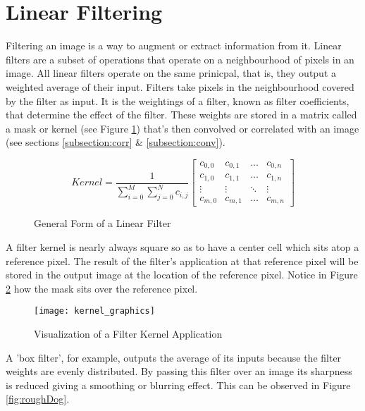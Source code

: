 \section{Linear Filtering}

Filtering an image is a way to augment or extract information from it. Linear filters are a subset of operations that operate on a neighbourhood of pixels in an image. All linear filters operate on the same prinicpal, that is, they output a weighted average of their input. Filters take pixels in the neighbourhood covered by the filter as input. It is the weightings of a filter, known as filter coefficients, that determine the effect of the filter. These weights are stored in a matrix called a mask or kernel (see Figure \ref{fig:generalForm}) that's then convolved or correlated with an image (see sections \ref{subsection:corr} \& \ref{subsection:conv}).


\begin{figure}[h]
  
   \[ 
     Kernel  = \frac{1}{\sum\limits_{i=0}^{M}\sum\limits_{j=0}^{N}c_{i,j}}
    \begin{bmatrix}
      c_{0,0} & c_{0,1} & \dots & c_{0,n} \\
      c_{1,0} & c_{1,1} & \dots & c_{1,n} \\
      \vdots & \vdots & \ddots & \vdots \\
      c_{m,0} & c_{m,1} & \dots & c_{m,n}
    \end{bmatrix}
  \]
  \caption{General Form of a Linear Filter}
  \label{fig:generalForm}
\end{figure}

 A filter kernel is nearly always square so as to have a center cell which sits atop a reference pixel. The result of the filter's application at that reference pixel will be stored in the output image at the location of the reference pixel. Notice in Figure \ref{fig:kernel_graphics} how the mask sits over the reference pixel.

\begin{figure}[H]
  \centering
  \centering\texttt{[image: kernel\_graphics]}
  \caption{Visualization of a Filter Kernel Application}
  \label{fig:kernel_graphics}
\end{figure}

A 'box filter', for example, outputs the average of its inputs because the filter weights are evenly distributed. By passing this filter over an image its sharpness is reduced giving a smoothing or blurring effect. This can be observed in Figure \ref{fig:roughDog}.

